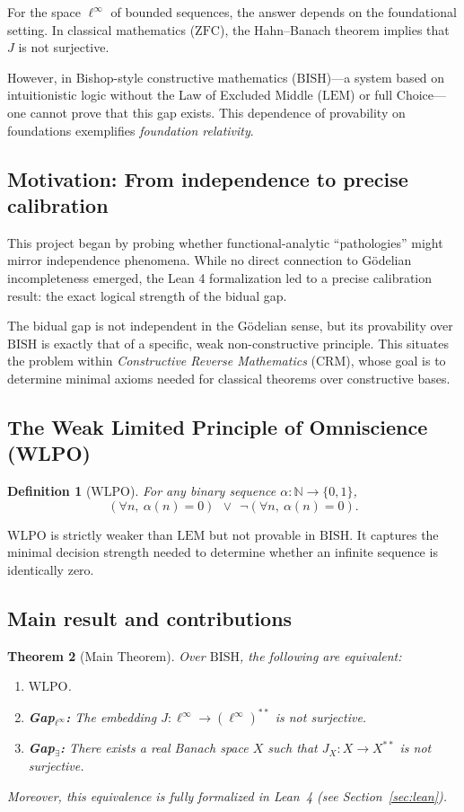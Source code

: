 \documentclass[11pt]{article}  %
\newtheorem{theorem}{Theorem}[section]
\newtheorem{definition}[theorem]{Definition}
\newenvironment{thm}{\begin{theorem}}{\end{theorem}}
\newenvironment{defi}{\begin{definition}}{\end{definition}}
\newtheorem{theorem}{Theorem}[section]
\newtheorem{definition}[theorem]{Definition}
\newenvironment{thm}{\begin{theorem}}{\end{theorem}}
\newenvironment{defi}{\begin{definition}}{\end{definition}}
\newcommand{\N}{\mathbb{N}}
\newcommand{\linf}{\ell^\infty}
\newcommand{\WLPO}{\mathrm{WLPO}}
\newcommand{\BISH}{\mathrm{BISH}}
\newcommand{\CRM}{\mathrm{CRM}}
\newcommand{\LEM}{\mathrm{LEM}}
\newcommand{\ZFC}{\mathrm{ZFC}}
\begin{document}
For the space $\linf$ of bounded sequences, the answer depends on the foundational setting. In classical mathematics ($\ZFC$), the Hahn--Banach theorem implies that $J$ is not surjective.

However, in Bishop-style constructive mathematics ($\BISH$)---a system based on intuitionistic logic without the Law of Excluded Middle ($\LEM$) or full Choice---one cannot prove that this gap exists. This dependence of provability on foundations exemplifies \emph{foundation relativity}.

\subsection{Motivation: From independence to precise calibration}

This project began by probing whether functional-analytic ``pathologies'' might mirror independence phenomena. While no direct connection to G\"odelian incompleteness emerged, the Lean 4 formalization led to a precise calibration result: the exact logical strength of the bidual gap.

The bidual gap is not independent in the G\"odelian sense, but its provability over $\BISH$ is exactly that of a specific, weak non-constructive principle. This situates the problem within \emph{Constructive Reverse Mathematics} ($\CRM$), whose goal is to determine minimal axioms needed for classical theorems over constructive bases.

\subsection{The Weak Limited Principle of Omniscience (WLPO)}

\begin{defi}[$\WLPO$]
For any binary sequence $\alpha:\N\to\{0,1\}$,
\[
(\forall n,\ \alpha(n)=0)\ \ \vee\ \ \neg(\forall n,\ \alpha(n)=0).
\]
\end{defi}

$\WLPO$ is strictly weaker than $\LEM$ but not provable in $\BISH$. It captures the minimal decision strength needed to determine whether an infinite sequence is identically zero.

\subsection{Main result and contributions}

\begin{thm}[Main Theorem]
Over $\BISH$, the following are equivalent:
\begin{enumerate}
\item $\WLPO$.
\item \textbf{Gap$_{\linf}$:} The embedding $J:\linf\to(\linf)^{**}$ is not surjective.
\item \textbf{Gap$_{\exists}$:} There exists a real Banach space $X$ such that $J_X:X\to X^{**}$ is not surjective.
\end{enumerate}
Moreover, this equivalence is fully formalized in Lean~4 (see Section~\ref{sec:lean}).
\end{thm}
\end{document}
